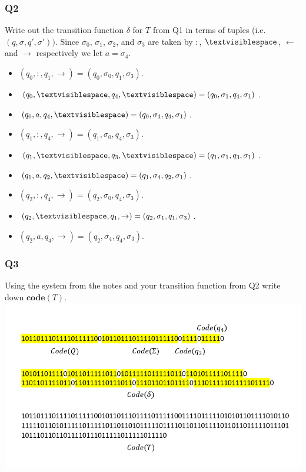 \documentclass[handout]{beamer}
\newcommand{\tvs}{\textvisiblespace}
\newcommand{\ra}{\rightarrow}
\newcommand{\la}{\leftarrow}
\newcommand{\co}{\mathbf{code}}
\begin{document}
\begin{frame}
\frametitle{Q2}
Write out the transition function $\delta$ for $T$ from Q1 in terms of tuples (i.e. $(q,\sigma,q',\sigma'))$. Since $\sigma_0$, $\sigma_1$, $\sigma_2$, and $\sigma_3$ are taken by $:$, $\tvs$, $\la$ and $\ra$ respectively we let $a=\sigma_4$.
\begin{itemize}
\item $(q_0, :, q_1, \ra) = (q_0,\sigma_0,q_1,\sigma_3)$.
\item $(q_0, \tvs, q_4, \tvs) = (q_0,\sigma_1,q_4,\sigma_1)$.
\item $(q_0,a,q_4,\tvs) = (q_0, \sigma_4,q_4,\sigma_1)$.
\item $(q_1, :, q_4, \ra)= (q_1,\sigma_0,q_4,\sigma_3)$.
\item $(q_1,\tvs,q_3,\tvs) = (q_1,\sigma_1,q_3,\sigma_1)$.
\item $(q_1,a,q_2,\tvs) = (q_1,\sigma_4,q_2,\sigma_1)$.
\item $(q_2,:,q_4,\ra) = (q_2,\sigma_0,q_4,\sigma_3)$.
\item $(q_2,\tvs,q_1,\ra) = (q_2,\sigma_1,q_1,\sigma_3)$.
\item $(q_2,a,q_4,\ra) = (q_2,\sigma_4, q_4,\sigma_3)$.
\end{itemize}


\end{frame}

\begin{frame}
\frametitle{Q3}
Using the system from the notes and your transition function from Q2 write down $\co(T)$.
 \includegraphics[width=\linewidth]{code.png}
\end{frame}
\end{document}
